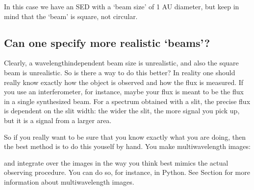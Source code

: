 \documentclass[letterpaper,10pt,english]{sphinxmanual}
\begin{document}
\begin{sphinxVerbatim}[commandchars=\\\{\}]
          
\end{sphinxVerbatim}

In this case we have an SED with a ‘beam size’ of 1 AU diameter, but keep in
mind that the ‘beam’ is square, not circular.


\subsection{Can one specify more realistic ‘beams’?}
\label{\detokenize{imagesspectra:can-one-specify-more-realistic-beams}}\label{\detokenize{imagesspectra:sec-aperture}}
Clearly, a wavelength\sphinxhyphen{}independent beam size is unrealistic, and also the square
beam is unrealistic. So is there a way to do this better? In reality one should
really know exactly how the object is observed and how the flux is measured. If
you use an interferometer, for instance, maybe your flux is meant to be the flux
in a single synthesized beam.  For a spectrum obtained with a slit, the precise
flux is dependent on the slit width: the wider the slit, the more signal you
pick up, but it is a signal from a larger area.

So if you really want to be sure that you know exactly what you are doing, then
the best method is to do this youself by hand. You make multi\sphinxhyphen{}wavelength images:

\begin{sphinxVerbatim}[commandchars=\\\{\}]
          
\end{sphinxVerbatim}

and integrate over the images in the way you think best mimics the actual
observing procedure. You can do so, for instance, in Python.  See Section
{\hyperref[\detokenize{imagesspectra:sec-multi-wavelength-images}]{}} for more information about multi\sphinxhyphen{}wavelength
images.
\end{document}
